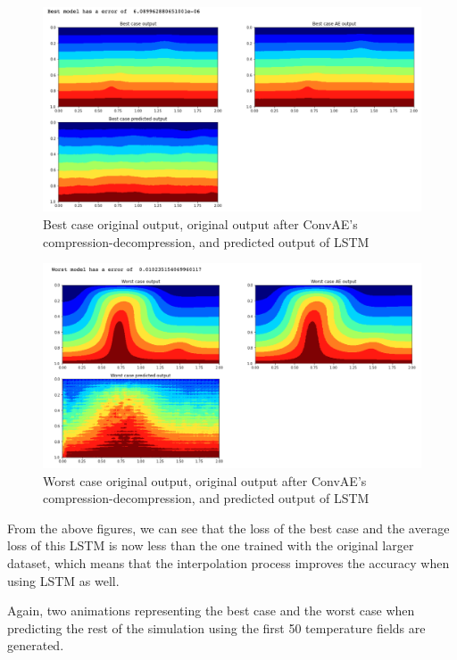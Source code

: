 \begin{figure}[H]
    \caption{Best case original output, original output after ConvAE's compression-decompression, and predicted output of LSTM}
    \includegraphics[scale=0.5]{figures/mantle_convection_images/larger_dataset_interpolated/LSTM_Best.png}
\end{figure}

\begin{figure}[H]
    \caption{Worst case original output, original output after ConvAE's compression-decompression, and predicted output of LSTM}
    \includegraphics[scale=0.5]{figures/mantle_convection_images/larger_dataset_interpolated/LSTM_Worst.png}
\end{figure}

From the above figures, we can see that the loss of the best case and the average loss of this LSTM is now less than the one trained with the  original larger dataset, which means that the interpolation process improves the accuracy when using LSTM as well.

Again, two animations representing the best case and the worst case when predicting the rest of the simulation using the first 50 temperature fields are generated.

